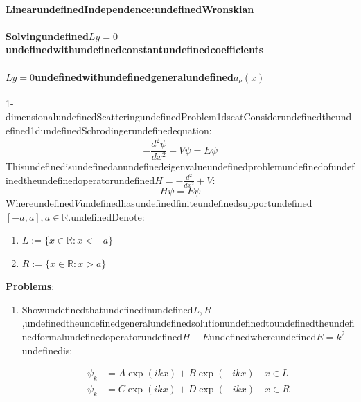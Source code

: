 \paragraph{LinearundefinedIndependence:undefinedWronskian}

\paragraph{Solvingundefined$Ly=0$undefinedwithundefinedconstantundefinedcoefficients}

\paragraph{$Ly=0$undefinedwithundefinedgeneralundefined$a_\nu(x)$}

\begin{mystexercise}{1-dimensionalundefinedScatteringundefinedProblem}{1dscat}\label{1dscat}Considerundefinedtheundefined1dundefinedSchrodingerundefinedequation:
\begin{equation}
-\frac{d^2\psi}{dx^2}+V\psi = E\psi
\end{equation}
Thisundefinedisundefinedanundefinedeigenvalueundefinedproblemundefinedofundefinedtheundefinedoperatorundefined$H= -\frac{d^2}{dx^2}+V$:
\begin{equation}
H\psi = E\psi
\end{equation}
Whereundefined$V$undefinedhasundefinedfiniteundefinedsupportundefined$[ -a, a], a\in \mathbb{R}$.undefinedDenote:

\begin{enumerate}
\item $L:=\{x\in \mathbb{R}:x< -a\}$
\item $R:=\{x\in \mathbb{R}:x>a\}$
\end{enumerate}

\textbf{Problems}:

\begin{enumerate}
\item Showundefinedthatundefinedinundefined$L,R$,undefinedtheundefinedgeneralundefinedsolutionundefinedtoundefinedtheundefinedformalundefinedoperatorundefined$H -E$undefinedwhereundefined$E=k^2$undefinedis:

\begin{equation}
\begin{aligned}
\psi_k &=A\exp(ikx)+B\exp(-ikx) \quad x\in L  \\
\psi_k &=C\exp(ikx)+D\exp(-ikx) \quad x\in R
\end{aligned}
\end{equation}



\end{enumerate}
\end{mystexercise}
